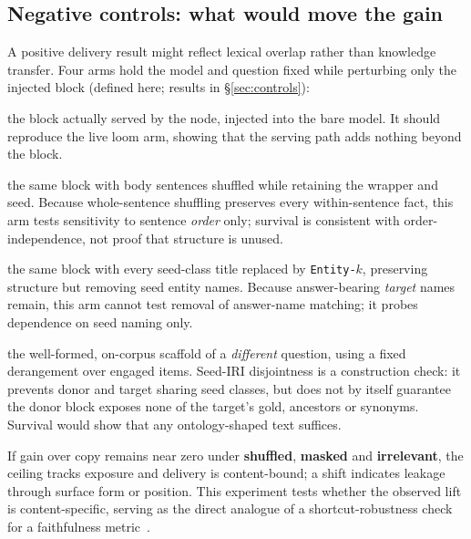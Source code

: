 \subsection{Negative controls: what would move the gain}\label{sec:ceiling-controls}
A positive delivery result might reflect lexical overlap rather than knowledge transfer. Four arms hold the model and question fixed while perturbing only the injected block (defined here; results in \S\ref{sec:controls}):
\begin{description}[topsep=2pt,itemsep=1pt,leftmargin=0pt,font=\normalfont\itshape]
\item[true] the block actually served by the node, injected into the bare model. It should reproduce the live loom arm, showing that the serving path adds nothing beyond the block.
\item[shuffled] the same block with body sentences shuffled while retaining the wrapper and seed. Because whole-sentence shuffling preserves every within-sentence fact, this arm tests sensitivity to sentence \emph{order} only; survival is consistent with order-independence, not proof that structure is unused.
\item[masked] the same block with every seed-class title replaced by \texttt{Entity-$k$}, preserving structure but removing seed entity names. Because answer-bearing \emph{target} names remain, this arm cannot test removal of answer-name matching; it probes dependence on seed naming only.
\item[irrelevant] the well-formed, on-corpus scaffold of a \emph{different} question, using a fixed derangement over engaged items. Seed-IRI disjointness is a construction check: it prevents donor and target sharing seed classes, but does not by itself guarantee the donor block exposes none of the target's gold, ancestors or synonyms. Survival would show that any ontology-shaped text suffices.
\end{description}
If gain over copy remains near zero under \textbf{shuffled}, \textbf{masked} and \textbf{irrelevant}, the ceiling tracks exposure and delivery is content-bound; a shift indicates leakage through surface form or position. This experiment tests whether the observed lift is content-specific, serving as the direct analogue of a shortcut-robustness check for a faithfulness metric~\cite{gao2023alce}.

